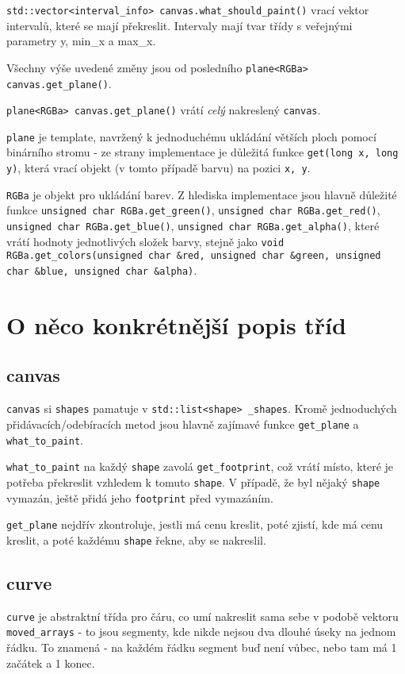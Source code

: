 \documentclass[11pt]{article} %
\begin{document}
\texttt{std::vector<interval\_info> canvas.what\_should\_paint()} vrací vektor intervalů, které se mají překreslit. Intervaly mají tvar třídy s veřejnými parametry y, min\_x a max\_x.

Všechny výše uvedené změny jsou od posledního \texttt{plane<RGBa> canvas.get\_plane()}.

\texttt{plane<RGBa> canvas.get\_plane()} vrátí \emph{celý} nakreslený \texttt{canvas}.

\texttt{plane} je template, navržený k jednoduchému ukládání větších ploch pomocí binárního stromu - ze strany implementace je důležitá funkce \texttt{get(long x, long y)}, která vrací objekt (v tomto případě barvu) na pozici \texttt{x, y}. 

\texttt{RGBa} je objekt pro ukládání barev. Z hlediska implementace jsou hlavně důležité funkce \texttt{unsigned char RGBa.get\_green()}, \texttt{unsigned char RGBa.get\_red()}, \texttt{unsigned char RGBa.get\_blue()}, \texttt{unsigned char RGBa.get\_alpha()}, které vrátí hodnoty jednotlivých složek barvy, stejně jako \texttt{void RGBa.get\_colors(unsigned char \&red, unsigned char \&green, unsigned char \&blue, unsigned char \&alpha)}.


\section{O něco konkrétnější popis tříd}
\subsection{canvas}

\texttt{canvas} si \texttt{shapes} pamatuje v \texttt{std::list<shape> \_shapes}. Kromě jednoduchých přidávacích/odebíracích metod jsou hlavně zajímavé funkce \texttt{get\_plane} a \texttt{what\_to\_paint}. 

\texttt{what\_to\_paint} na každý \texttt{shape} zavolá \texttt{get\_footprint}, což vrátí místo, které je potřeba překreslit vzhledem k tomuto \texttt{shape}. V případě, že byl nějaký \texttt{shape} vymazán, ještě přidá jeho \texttt{footprint} před vymazáním.

\texttt{get\_plane} nejdřív zkontroluje, jestli má cenu kreslit, poté zjistí, kde má cenu kreslit, a poté každému \texttt{shape} řekne, aby se nakreslil. 

\subsection{curve}
\texttt{curve} je abstraktní třída pro čáru, co umí nakreslit sama sebe v podobě vektoru \texttt{moved\_arrays} - to jsou segmenty, kde nikde nejsou dva dlouhé úseky na jednom řádku. To znamená - na každém řádku segment buď není vůbec, nebo tam má 1 začátek a 1 konec.
\end{document}

